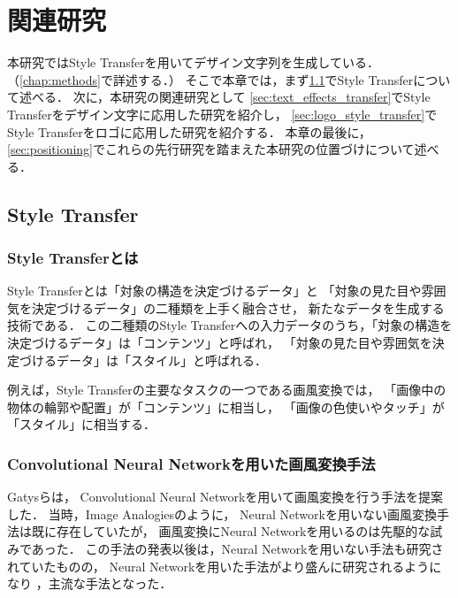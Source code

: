 \documentclass[\homedir/main.tex]{subfiles}
\begin{document}
\setcounter{chapter}{1}
\chapter{関連研究}\label{chap:related_works}
本研究ではStyle Transferを用いてデザイン文字列を生成している．（\cref{chap:methods}で詳述する．）
そこで本章では，まず\cref{sec:style_transfer}でStyle Transferについて述べる．
次に，本研究の関連研究として
\cref{sec:text_effects_transfer}でStyle Transferをデザイン文字に応用した研究を紹介し，
\cref{sec:logo_style_transfer}でStyle Transferをロゴに応用した研究を紹介する．
本章の最後に，\cref{sec:positioning}でこれらの先行研究を踏まえた本研究の位置づけについて述べる．

\section{Style Transfer}\label{sec:style_transfer}
\subsection{Style Transferとは}
Style Transferとは「対象の構造を決定づけるデータ」と
「対象の見た目や雰囲気を決定づけるデータ」の二種類を上手く融合させ，
新たなデータを生成する技術である．
この二種類のStyle Transferへの入力データのうち，「対象の構造を決定づけるデータ」は「コンテンツ」と呼ばれ，
「対象の見た目や雰囲気を決定づけるデータ」は「スタイル」と呼ばれる．

例えば，Style Transferの主要なタスクの一つである画風変換では，
「画像中の物体の輪郭や配置」が「コンテンツ」に相当し，
「画像の色使いやタッチ」が「スタイル」に相当する．

\subsection{Convolutional Neural Networkを用いた画風変換手法}
Gatysら\cite{Gatys_2016_CVPR}は，
Convolutional Neural Networkを用いて画風変換を行う手法を提案した．
当時，Image Analogies\cite{10.1145/383259.383295}のように，
Neural Networkを用いない画風変換手法は既に存在していたが，
画風変換にNeural Networkを用いるのは先駆的な試みであった．
この手法の発表以後は，Neural Networkを用いない手法も研究されていた\cite{7874180}ものの，
Neural Networkを用いた手法がより盛んに研究されるようになり
\cite{10.1007/978-3-319-46475-6_43, 10.5555/3172077.3172198}，主流な手法となった．
\end{document}
